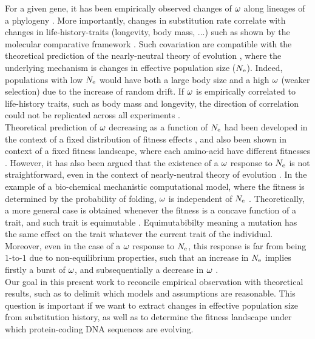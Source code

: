 \documentclass{article}
\begin{document}
For a given gene, it has been empirically observed changes of $\omega$ along lineages of a phylogeny \cite{Yang2001, Zhang2004}.
More importantly, changes in substitution rate correlate with changes in life-history-traits (longevity, body mass, ...) such as shown by the molecular comparative framework \cite{Lartillot2011,Weber2014}.
Such covariation are compatible with the theoretical prediction of the nearly-neutral theory of evolution \cite{Ohta1972, Ohta1992}, where the underlying mechanism is changes in effective population size ($N_{\mathrm{e}}$).
Indeed, populations with low $N_{\mathrm{e}}$ would have both a large body size and a high $\omega$ (weaker selection) due to the increase of random drift.
If $\omega$ is empirically correlated to life-history traits, such as body mass and longevity, the direction of correlation could not be replicated across all experiments \cite{Figuet2016}.\\

Theoretical prediction of $\omega$ decreasing as a function of $N_{\mathrm{e}}$ had been developed in the context of a fixed distribution of fitness effects \cite{Ohta1972, Welch2008}, and also been shown in context of a fixed fitness landscape, where each amino-acid have different fitnesses \cite{Spielman2015a, DosReis2015}.
However, it has also been argued that the existence of a $\omega$ response to $N_{\mathrm{e}}$ is not straightforward, even in the context of nearly-neutral theory of evolution \cite{Lanfear2014}.
In the example of a bio-chemical mechanistic computational model, where the fitness is determined by the probability of folding, $\omega$ is independent of $N_{\mathrm{e}}$ \cite{Goldstein2013}.
Theoretically, a more general case is obtained whenever the fitness is a concave function of a trait, and such trait is equimutable \cite{Cherry1998}.
Equimutabibilty meaning a mutation has the same effect on the trait whatever the current trait of the individual.
Moreover, even in the case of a $\omega$ response to $N_{\mathrm{e}}$, this response is far from being $1$-to-$1$ due to non-equilibrium properties, such that an increase in $N_{\mathrm{e}}$ implies firstly a burst of $\omega$, and subsequentially a decrease in $\omega$ \cite{Jones2016}.\\

Our goal in this present work to reconcile empirical observation with theoretical results, such as to delimit which models and assumptions are reasonable.
This question is important if we want to extract changes in effective population size from substitution history, as well as to determine the fitness landscape under which protein-coding DNA sequences are evolving.
\end{document}

